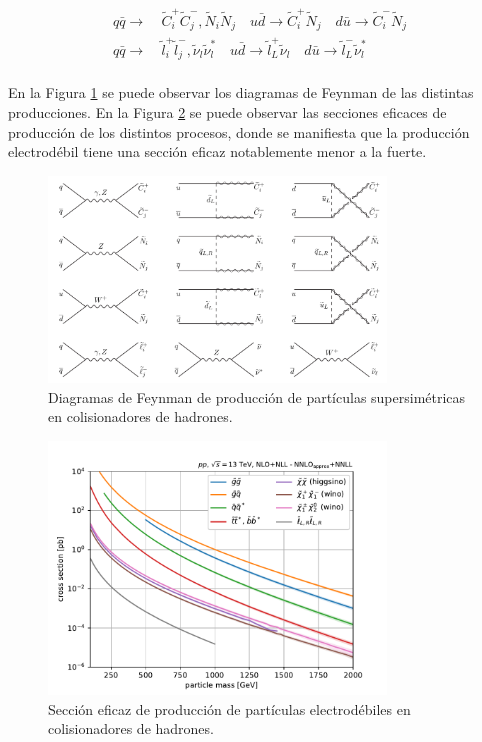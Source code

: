 \begin{equation}
	\begin{split}
		q\bar{q}\to &\ \tilde{C}_i^{+}\tilde{C}_j^{-},\tilde{N}_i\tilde{N}_j \quad u\bar{d}\to\tilde{C}_i^{+}\tilde{N}_j \quad d\bar{u}\to\tilde{C}_i^{-}\tilde{N}_j \\
		q\bar{q}\to &\ \tilde{l}_i^{+}\tilde{l}_j^{-},\tilde{\nu}_l\tilde{\nu}_l^* \quad u\bar{d}\to\tilde{l}_L^{+}\tilde{\nu}_l \quad d\bar{u}\to\tilde{l}_L^{-}\tilde{\nu}_l^* \\
	\end{split}
\end{equation}

En la Figura \ref{fig:sp_production} se puede observar los diagramas de Feynman de las distintas producciones. En la Figura \ref{fig:susy_xs} se puede observar las secciones eficaces de producción de los distintos procesos, donde se manifiesta que la producción electrodébil tiene una sección eficaz notablemente menor a la fuerte.

\begin{figure}
  \centering
  \includegraphics[width=0.8\textwidth]{images/sp_production.png}
  \caption{Diagramas de Feynman de producción de partículas supersimétricas en colisionadores de hadrones. }
  \label{fig:sp_production}
\end{figure}

\begin{figure}
  \centering
  \includegraphics[width=0.8\textwidth]{images/SUSY_xsecs_13TeV_overview.pdf}
  \caption{Sección eficaz de producción de partículas electrodébiles en colisionadores de hadrones\cite{susy_xs}.}
  \label{fig:susy_xs}
\end{figure}


